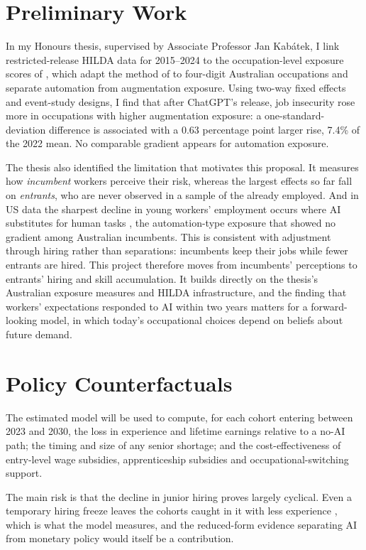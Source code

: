 \documentclass[11pt,a4paper]{article}
\begin{document}
\section{Preliminary Work}

In my Honours thesis, supervised by Associate Professor Jan Kab\'{a}tek, I link restricted-release HILDA data for 2015--2024 to the occupation-level exposure scores of \citet{jsa2025}, which adapt the method of \citet{gmyrek2023} to four-digit Australian occupations and separate automation from augmentation exposure. Using two-way fixed effects and event-study designs, I find that after ChatGPT's release, job insecurity rose more in occupations with higher augmentation exposure: a one-standard-deviation difference is associated with a 0.63 percentage point larger rise, 7.4\% of the 2022 mean. No comparable gradient appears for automation exposure.

The thesis also identified the limitation that motivates this proposal. It measures how \emph{incumbent} workers perceive their risk, whereas the largest effects so far fall on \emph{entrants}, who are never observed in a sample of the already employed. And in US data the sharpest decline in young workers' employment occurs where AI substitutes for human tasks \citep{brynjolfsson2026canaries}, the automation-type exposure that showed no gradient among Australian incumbents. This is consistent with adjustment through hiring rather than separations: incumbents keep their jobs while fewer entrants are hired. This project therefore moves from incumbents' perceptions to entrants' hiring and skill accumulation. It builds directly on the thesis's Australian exposure measures and HILDA infrastructure, and the finding that workers' expectations responded to AI within two years matters for a forward-looking model, in which today's occupational choices depend on beliefs about future demand.

\section{Policy Counterfactuals}

The estimated model will be used to compute, for each cohort entering between 2023 and 2030, the loss in experience and lifetime earnings relative to a no-AI path; the timing and size of any senior shortage; and the cost-effectiveness of entry-level wage subsidies, apprenticeship subsidies and occupational-switching support.

The main risk is that the decline in junior hiring proves largely cyclical. Even a temporary hiring freeze leaves the cohorts caught in it with less experience \citep{friebel2026}, which is what the model measures, and the reduced-form evidence separating AI from monetary policy would itself be a contribution.

\clearpage


\end{document}
